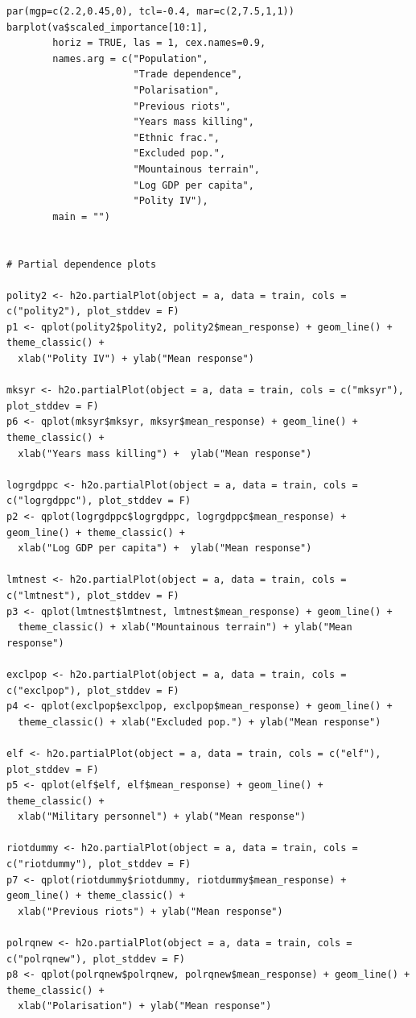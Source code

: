 \begin{verbatim}
par(mgp=c(2.2,0.45,0), tcl=-0.4, mar=c(2,7.5,1,1))
barplot(va$scaled_importance[10:1],
        horiz = TRUE, las = 1, cex.names=0.9,
        names.arg = c("Population", 
                      "Trade dependence",
                      "Polarisation",
                      "Previous riots",
                      "Years mass killing",
                      "Ethnic frac.", 
                      "Excluded pop.",
                      "Mountainous terrain",
                      "Log GDP per capita",
                      "Polity IV"),
        main = "")


# Partial dependence plots

polity2 <- h2o.partialPlot(object = a, data = train, cols = c("polity2"), plot_stddev = F)
p1 <- qplot(polity2$polity2, polity2$mean_response) + geom_line() + theme_classic() +
  xlab("Polity IV") + ylab("Mean response")

mksyr <- h2o.partialPlot(object = a, data = train, cols = c("mksyr"), plot_stddev = F)
p6 <- qplot(mksyr$mksyr, mksyr$mean_response) + geom_line() + theme_classic() +
  xlab("Years mass killing") +  ylab("Mean response")

logrgdppc <- h2o.partialPlot(object = a, data = train, cols = c("logrgdppc"), plot_stddev = F)
p2 <- qplot(logrgdppc$logrgdppc, logrgdppc$mean_response) + geom_line() + theme_classic() +
  xlab("Log GDP per capita") +  ylab("Mean response")

lmtnest <- h2o.partialPlot(object = a, data = train, cols = c("lmtnest"), plot_stddev = F)
p3 <- qplot(lmtnest$lmtnest, lmtnest$mean_response) + geom_line() +
  theme_classic() + xlab("Mountainous terrain") + ylab("Mean response")

exclpop <- h2o.partialPlot(object = a, data = train, cols = c("exclpop"), plot_stddev = F)
p4 <- qplot(exclpop$exclpop, exclpop$mean_response) + geom_line() +
  theme_classic() + xlab("Excluded pop.") + ylab("Mean response")

elf <- h2o.partialPlot(object = a, data = train, cols = c("elf"), plot_stddev = F)
p5 <- qplot(elf$elf, elf$mean_response) + geom_line() + theme_classic() +
  xlab("Military personnel") + ylab("Mean response")

riotdummy <- h2o.partialPlot(object = a, data = train, cols = c("riotdummy"), plot_stddev = F)
p7 <- qplot(riotdummy$riotdummy, riotdummy$mean_response) + geom_line() + theme_classic() +
  xlab("Previous riots") + ylab("Mean response")

polrqnew <- h2o.partialPlot(object = a, data = train, cols = c("polrqnew"), plot_stddev = F)
p8 <- qplot(polrqnew$polrqnew, polrqnew$mean_response) + geom_line() + theme_classic() +
  xlab("Polarisation") + ylab("Mean response")


\end{verbatim}
